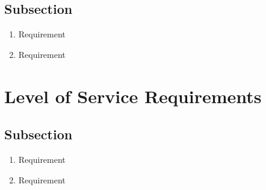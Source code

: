\documentclass[titlepage, twoside]{article}
\begin{document}
	\subsection{Subsection}\begin{enumerate}
		\item Requirement
		\item Requirement
	\end{enumerate}		
	
\section{Level of Service Requirements}

	\subsection{Subsection}\begin{enumerate}
		\item Requirement
		\item Requirement
	\end{enumerate}
		
\end{document}
